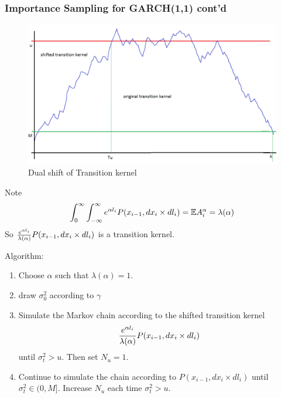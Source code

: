 \documentclass{beamer}
\begin{document}
\begin{frame}
  \frametitle{Importance Sampling for GARCH(1,1) cont'd}
  \begin{minipage}[t]{0.5\linewidth}
    \begin{figure}
      \centering
      \includegraphics[width=1.0\linewidth]{pic1.png}
      \caption{\footnotesize Dual shift of Transition kernel}
      \label{fig:dual_measure}
    \end{figure}
    \begin{scriptsize}
      Note
      \[
      \int_0^\infty \int_{-\infty}^{\infty}
      e^{\alpha l_i}
      P(x_{i-1}, d x_{i} \times dl_{i})
      = \mathbb{E} A_i^\alpha = \lambda(\alpha)
      \]
      So
      ${e^{\alpha l_i} \over \lambda(\alpha)}P(x_{i-1}, d x_{i} \times dl_{i})$ is a transition kernel.
    \end{scriptsize}
  \end{minipage}\hfill
  \begin{minipage}[t]{0.45\linewidth}
    \begin{footnotesize}
      Algorithm:
      \begin{enumerate}
      \item Choose $\alpha$ such that $\lambda(\alpha) = 1$.
      \item draw $\sigma_0^2$ according to $\gamma$
      \item Simulate the Markov chain according to the shifted transition
        kernel
        \[
        {e^{\alpha l_i} \over \lambda(\alpha)}
        P(x_{i-1}, d x_{i} \times dl_{i})
        \]
        until $\sigma_t^2 > u$. Then set $N_u = 1$.
      \item Continue to simulate the chain according to $P(x_{i-1}, d
        x_{i} \times dl_{i})$ until $\sigma_t^2 \in (0, M]$. Increase $N_u$
        each time $\sigma_t^2 > u$.
      \end{enumerate}
    \end{footnotesize}
  \end{minipage}
\end{frame}
\end{document}

